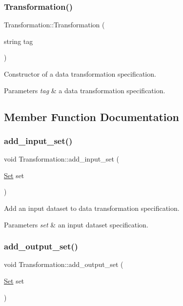\subsubsection{\texorpdfstring{Transformation()}{Transformation()}}
{\footnotesize\ttfamily Transformation\+::\+Transformation (\begin{DoxyParamCaption}\item[{string}]{tag }\end{DoxyParamCaption})\hspace{0.3cm}{\ttfamily [inline]}}

Constructor of a data transformation specification. 
\begin{DoxyParams}{Parameters}
{\em tag} & a data transformation specification. \\
\hline
\end{DoxyParams}


\subsection{Member Function Documentation}
\mbox{\label{classTransformation_a2a2af5b05352dd3d401c7af6027248d0}} 
\subsubsection{\texorpdfstring{add\+\_\+input\+\_\+set()}{add\_input\_set()}}
{\footnotesize\ttfamily void Transformation\+::add\+\_\+input\+\_\+set (\begin{DoxyParamCaption}\item[{\hyperlink{classSet}{Set}}]{set }\end{DoxyParamCaption})}

Add an input dataset to data transformation specification. 
\begin{DoxyParams}{Parameters}
{\em set} & an input dataset specification. \\
\hline
\end{DoxyParams}
\mbox{\label{classTransformation_a63b5bc7696a22e413d95540703738894}} 
\subsubsection{\texorpdfstring{add\+\_\+output\+\_\+set()}{add\_output\_set()}}
{\footnotesize\ttfamily void Transformation\+::add\+\_\+output\+\_\+set (\begin{DoxyParamCaption}\item[{\hyperlink{classSet}{Set}}]{set }\end{DoxyParamCaption})}

